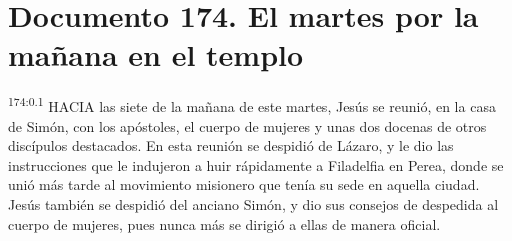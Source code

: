 \chapter{Documento 174. El martes por la mañana en el templo}
\par 
\textsuperscript{174:0.1} HACIA las siete de la mañana de este martes, Jesús se reunió, en la casa de Simón, con los apóstoles, el cuerpo de mujeres y unas dos docenas de otros discípulos destacados. En esta reunión se despidió de Lázaro, y le dio las instrucciones que le indujeron a huir rápidamente a Filadelfia en Perea, donde se unió más tarde al movimiento misionero que tenía su sede en aquella ciudad. Jesús también se despidió del anciano Simón, y dio sus consejos de despedida al cuerpo de mujeres, pues nunca más se dirigió a ellas de manera oficial.

